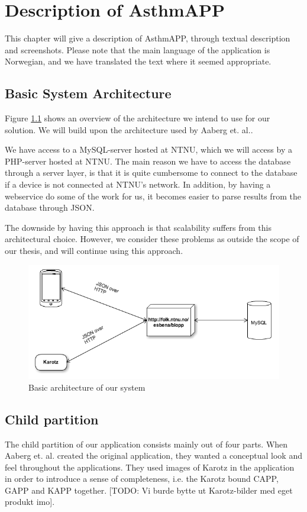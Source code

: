 \chapter{Description of AsthmAPP}
\label{chp:description}

This chapter will give a description of AsthmAPP, through textual description and screenshots. Please note that the main language of the application is Norwegian, and we have translated the text where it seemed appropriate. 

\section{Basic System Architecture}
\label{sec:architecture}
Figure \ref{fig:basic-architecture} shows an overview of the architecture we intend to use for our solution. We will build upon the architecture used by Aaberg et. al.\cite{CustomerDriven}.

We have access to a MySQL-server hosted at NTNU, which we will access by a PHP-server hosted at NTNU. The main reason we have to access the database through a server layer, is that it is quite cumbersome to connect to the database if a device is not connected at NTNU's network. In addition, by having a webservice do some of the work for us, it becomes easier to parse results from the database through JSON.   


The downside by having this approach is that scalability suffers from this architectural choice. However, we consider these problems as outside the scope of our thesis, and will continue using this approach.

\begin{figure}
		\centering
			\includegraphics[width=0.50\paperwidth]{Pictures/basic-architecture.png}
		\caption{Basic architecture of our system}
		\label{fig:basic-architecture}
\end{figure}

\section{Child partition}
\label{sec:description-child-partition}
The child partition of our application consists mainly out of four parts. When Aaberg et. al. created the original application, they wanted a conceptual look and feel throughout the applications. They used images of Karotz in the application in order to introduce a sense of completeness, i.e. the Karotz bound CAPP, GAPP and KAPP together. [TODO: Vi burde bytte ut Karotz-bilder med eget produkt imo]. 

